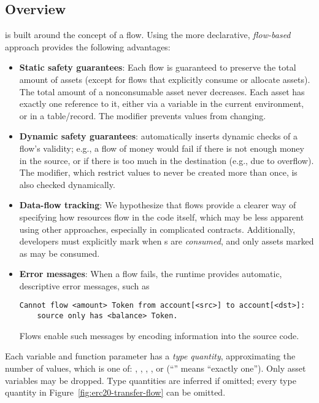 \documentclass[dvipsnames,runningheads]{llncs}
\begin{document}
\subsection{Overview}

\langName is built around the concept of a flow.
Using the more declarative, \emph{flow-based} approach provides the following advantages:
\begin{itemize}
    \item \textbf{Static safety guarantees}: Each flow is guaranteed to preserve the total amount of assets (except for flows that explicitly consume or allocate assets). %
        The total amount of a nonconsumable asset never decreases.
        Each asset has exactly one reference to it, either via a variable in the current environment, or in a table/record.
        The  modifier prevents values from changing.
    \item \textbf{Dynamic safety guarantees}: \langName automatically inserts dynamic checks of a flow's validity; e.g., a flow of money would fail if there is not enough money in the source, or if there is too much in the destination (e.g., due to overflow).
        The  modifier, which restrict values to never be created more than once, is also checked dynamically.
    \item \textbf{Data-flow tracking}: We hypothesize that flows provide a clearer way of specifying how resources flow in the code itself, which may be less apparent using other approaches, especially in complicated contracts.
        Additionally, developers must explicitly mark when \assetTxt{}s are \emph{consumed}, and only assets marked as  may be consumed.
    \item \textbf{Error messages}: When a flow fails, the \langName runtime provides automatic, descriptive error messages, such as
\begin{lstlisting}[numbers=none, basicstyle=\small\ttfamily, xleftmargin=-5.0ex]
Cannot flow <amount> Token from account[<src>] to account[<dst>]:
    source only has <balance> Token.
\end{lstlisting}
        Flows enable such messages by encoding information into the source code.
\end{itemize}

Each variable and function parameter has a \emph{type quantity}, approximating the number of values, which is one of: , , \flowinline{!}, , or  (``\flowinline{!}'' means ``exactly one'').
Only  asset variables may be dropped.
Type quantities are inferred if omitted; every type quantity in Figure~\ref{fig:erc20-transfer-flow} can be omitted.
\end{document}
